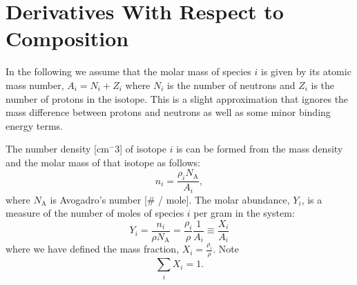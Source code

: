   \section{Derivatives With Respect to Composition}
  \label{Sec:Derivatives With Respect to Composition}
  In the following we assume that the molar mass of species $i$ is given by its
  atomic mass number, $A_i = N_i + Z_i$ where $N_i$ is the number of neutrons
  and $Z_i$ is the number of protons in the isotope.    This 
  is a slight approximation that ignores the mass difference between protons 
  and neutrons as well as some minor binding energy terms.
  
  The number density [cm$^-{3}$] of isotope $i$ is can be formed from the mass 
  density and the molar mass of that isotope as follows:
  \begin{equation}\label{eq:number density}
    n_i = \frac{\rho_i N_\text{A}}{A_i},
  \end{equation}
  where $N_\text{A}$ is Avogadro's number [\# / mole].  The molar abundance, 
  $Y_i$, is a measure of the number of moles of species $i$ per gram in the 
  system:
  \begin{equation}\label{eq:molar abundance}
    Y_i = \frac{n_i}{\rho N_\text{A}} = \frac{\rho_i}{\rho}\frac{1}{A_i} 
    \equiv \frac{X_i}{A_i}
  \end{equation}
  where we have defined the mass fraction, $X_i = \frac{\rho_i}{\rho}$.  Note
  \begin{equation}\label{eq:mass fraction sums to 1}
    \sum_i X_i = 1.
  \end{equation}
  

